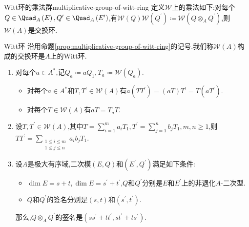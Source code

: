 \begin{proposition}{Witt环的乘法群}{multiplicative-group-of-witt-ring}
	定义$\mathcal{W}$上的乘法如下:对每个$Q\in\Quad_{A}\left(E\right),Q^{\prime}\in\Quad_{A}\left(E^{\prime}\right)$,有$\mathcal{W}\left(Q\right)\mathcal{W}\left(Q^{\prime}\right)\coloneq\mathcal{W}\left(Q\otimes_{A}Q^{\prime}\right)$,则$\mathcal{W}\left(A\right)$是交换环.
\end{proposition}

\begin{definition}{Witt环}{}
	沿用命题\ref{prop:multiplicative-group-of-witt-ring}的记号.我们称$\mathcal{W}\left(A\right)$构成的交换环是$A$上的Witt环.
\end{definition}

\begin{remark}{}{}
	\begin{enumerate}
		\item 对每个$a\in A^{\ast}$,记$Q_{a}\coloneq aQ_{1},T_{a}\coloneq\mathcal{W}\left(Q_{a}\right)$.
		\begin{itemize}
			\item 对每个$a\in A^{\ast}$和$T,T^{\prime}\in\mathcal{W}\left(A\right)$有$a\left(TT^{\prime}\right)=\left(aT\right)T^{\prime}=T\left(aT^{\prime}\right)$.
			\item 对每个$T\in\mathcal{W}\left(A\right)$有$aT=T_{a}T$.
		\end{itemize}
		\item 设$T,T^{\prime}\in\mathcal{W}\left(A\right)$,其中$T=\sum\limits_{i=1}^{m}a_{i}T_{1},T^{\prime}=\sum\limits_{j=1}^{n}b_{j}T_{1},m,n\geq 1$,则$TT^{\prime}=\sum\limits_{\substack{1\leq i\leq m\\1\leq j\leq n}}a_{i}b_{j}T_{1}$.
		\item 设$A$是极大有序域,二次模$\left(E,Q\right)$和$\left(E^{\prime},Q^{\prime}\right)$满足如下条件:
		\begin{itemize}
			\item $\dim E=s+t,\dim E=s^{\prime}+t^{\prime}$,$Q$和$Q^{\prime}$分别是$E$和$E^{\prime}$上的非退化$A$-二次型.
			\item $Q$和$Q^{\prime}$的签名分别是$\left(s,t\right)$和$\left(s^{\prime},t^{\prime}\right)$.
		\end{itemize}
		那么,$Q\otimes_{A}Q^{\prime}$的签名是$\left(ss^{\prime}+tt^{\prime},st^{\prime}+ts^{\prime}\right)$.
	\end{enumerate}
\end{remark}






























